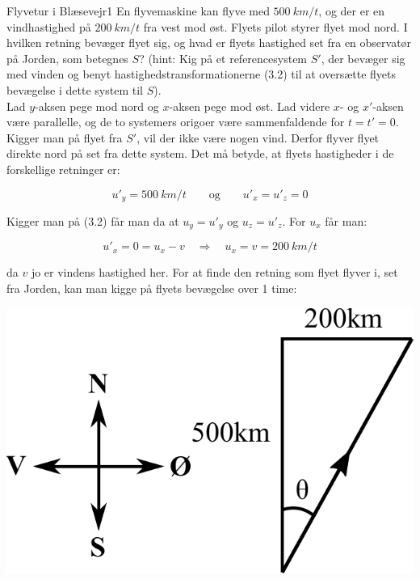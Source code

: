 \begin{opgave}{Flyvetur i Blæsevejr}{1}
	En flyvemaskine kan flyve med  $\SI{500}{km/t}$, og der er en vindhastighed på $\SI{200}{km/t}$ fra vest mod øst.
	\opg Flyets pilot styrer flyet mod nord. I hvilken retning bevæger flyet sig, og hvad er flyets hastighed set fra en observatør på Jorden, som betegnes $S$? (hint: Kig på et referencesystem $S'$, der bevæger sig med vinden og benyt hastighedstransformationerne (3.2) til at oversætte flyets bevægelse i dette system til $S$).\\
	
	Lad $y$-aksen pege mod nord og $x$-aksen pege mod øst. Lad videre $x$- og $x'$-aksen være parallelle, og de to systemers origoer være sammenfaldende for $t=t'=0$. Kigger man på flyet fra $S'$, vil der ikke være nogen vind. Derfor flyver flyet direkte nord på set fra dette system. Det må betyde, at flyets hastigheder i de forskellige retninger er:
	
	$$u'_y = \SI{500}{km/t} \quad \quad \text{og} \quad \quad u'_x = u'_z = 0$$
	
	\vspace{2mm}
	
	Kigger man på (3.2) får man da at $u_y = u'_y$ og $u_z = u'_z$. For $u_x$ får man:
	
	$$u'_x = 0 = u_x - v \quad \Rightarrow \quad u_x = v = \SI{200}{km/t}$$
	
	\vspace{2mm}
	
	da $v$ jo er vindens hastighed her. For at finde den retning som flyet flyver i, set fra Jorden, kan man kigge på flyets bevægelse over 1 time:
	
	\begin{center}
		\includegraphics[scale=0.8]{Relativitetsteori/fly_fig.pdf}
	\end{center}
	

\end{opgave}
